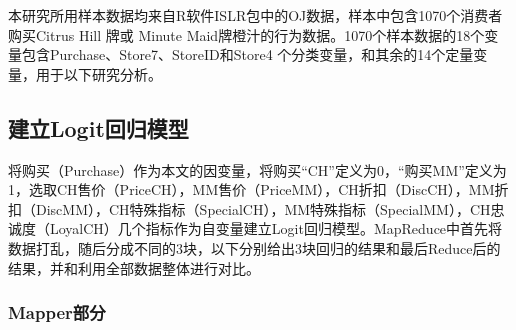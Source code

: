 本研究所用样本数据均来自R软件ISLR包中的OJ数据，样本中包含1070个消费者购买Citrus
Hill 牌或 Minute
Maid牌橙汁的行为数据。1070个样本数据的18个变量包含Purchase、Store7、StoreID和Store4
个分类变量，和其余的14个定量变量，用于以下研究分析。

\subsection{建立Logit回归模型}\label{ux5efaux7acblogitux56deux5f52ux6a21ux578b}

将购买（Purchase）作为本文的因变量，将购买``CH''定义为0，``购买MM''定义为1，选取CH售价（PriceCH），MM售价（PriceMM），CH折扣（DiscCH），MM折扣（DiscMM），CH特殊指标（SpecialCH），MM特殊指标（SpecialMM），CH忠诚度（LoyalCH）几个指标作为自变量建立Logit回归模型。MapReduce中首先将数据打乱，随后分成不同的3块，以下分别给出3块回归的结果和最后Reduce后的结果，并和利用全部数据整体进行对比。

\subsubsection{Mapper部分}\label{mapperux90e8ux5206}

